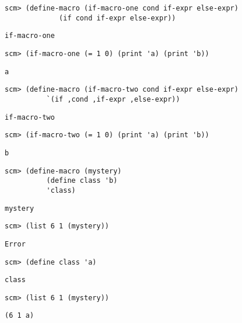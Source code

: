 \begin{blocksection}

\begin{lstlisting}
scm> (define-macro (if-macro-one cond if-expr else-expr)
             (if cond if-expr else-expr))
\end{lstlisting}
\begin{solution}[.25in]
\texttt{if-macro-one}
\end{solution}

\begin{lstlisting}
scm> (if-macro-one (= 1 0) (print 'a) (print 'b))
\end{lstlisting}
\begin{solution}[.25in]
\texttt{a}
\end{solution}

\begin{lstlisting}
scm> (define-macro (if-macro-two cond if-expr else-expr)
          `(if ,cond ,if-expr ,else-expr))
\end{lstlisting}
\begin{solution}[.25in]
\texttt{if-macro-two}
\end{solution}

\begin{lstlisting}
scm> (if-macro-two (= 1 0) (print 'a) (print 'b))
\end{lstlisting}
\begin{solution}[.25in]
\texttt{b}
\end{solution}

\begin{lstlisting}
scm> (define-macro (mystery)
          (define class 'b)
          'class)
\end{lstlisting}
\begin{solution}[.25in]
\texttt{mystery}
\end{solution}

\begin{lstlisting}
scm> (list 6 1 (mystery))
\end{lstlisting}
\begin{solution}[.25in]
\texttt{Error}
\end{solution}

\begin{lstlisting}
scm> (define class 'a)
\end{lstlisting}
\begin{solution}[.25in]
\texttt{class}
\end{solution}

\begin{lstlisting}
scm> (list 6 1 (mystery))
\end{lstlisting}
\begin{solution}[.25in]
\texttt{(6 1 a)}
\end{solution}
\end{blocksection}
